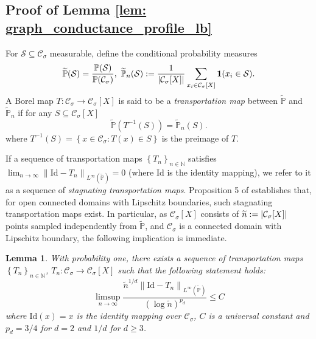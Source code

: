 \documentclass{article}
\DeclarePairedDelimiter\abs{\lvert}{\rvert}
\newcommand{\set}[1]{\left\{#1\right\}}
\newcommand{\seq}[1]{\left\{#1\right\}_{n \in \mathbb{N}}}
\newcommand{\norm}[1]{\left\lVert#1\right\rVert}
\newcommand{\1}{\mathbf{1}}
\newcommand{\Xbf}{X}             %
\newcommand{\Pbb}{\mathbb{P}}
\newcommand{\Sset}{\mathcal{S}}
\newcommand{\Cset}{\mathcal{C}}
\newcommand{\Csig}{\Cset_{\sigma}}
\theoremstyle{aldenthm}
\newtheorem{lemma}{Lemma}
\theoremstyle{aldenrmrk}
\begin{document}
\subsection{Proof of Lemma \ref{lem: graph_conductance_profile_lb}}
\label{sec: proof_of_lemma_graph_conductance}

For $\Sset \subseteq \Csig$ measurable, define the conditional probability measures
\begin{equation*}
\widetilde{\Pbb}(\Sset) = \frac{\Pbb(\Sset)}{\Pbb(\Csig)}, ~ \widetilde{\Pbb}_{n}(\Sset) := \frac{1}{\abs{\Csig[\Xbf]}} \sum_{x_i \in \Csig[\Xbf]} \1(x_i \in \Sset).
\end{equation*} 
A Borel map $T: \Csig \to \Csig[\Xbf]$ is said to be a \emph{transportation map} between $\widetilde{\Pbb}$ and $\widetilde{\Pbb}_n$ if for any $S \subseteq \Csig[\Xbf]$
\begin{equation*}
\widetilde{\Pbb}(T^{-1}(S)) = \widetilde{\Pbb}_n(S).
\end{equation*}
where $T^{-1}(S) = \set{x \in \Csig: T(x) \in S}$ is the preimage of $T$. 

If a sequence of transportation maps $\seq{T_n}$ satisfies $\lim_{n \to \infty}\norm{\mathrm{Id} - T_n}_{L^{\infty}(\widetilde{\Pbb})} = 0$ (where $\mathrm{Id}$ is the identity mapping), we refer to it as a sequence of \emph{stagnating transportation maps}. Proposition 5 of \cite{garciatrillos16} establishes that, for open connected domains with Lipschitz boundaries, such stagnating transportation maps exist. In particular, as $\Csig[\Xbf]$ consists of $\widetilde{n} := \abs{\Csig[\Xbf]}$ points sampled independently from $\widetilde{\Pbb}$, and $\Csig$ is a connected domain with Lipschitz boundary, the following implication is immediate.

\begin{lemma}
	\label{lem: stagnating_transportation_maps}
	With probability one, there exists a sequence of transportation maps $\seq{T_n}$, $T_n: \Csig \to \Csig[\Xbf]$ such that the following statement holds:
	\begin{equation}
	\label{eqn: stagnating_transportation_maps}
	\limsup_{n \to \infty} \frac{\widetilde{n}^{1/d} \norm{\mathrm{Id} - T_n}_{L^{\infty}(\widetilde{\Pbb})}}{(\log \widetilde{n})^{p_d}} \leq C
	\end{equation}
	where $\mathrm{Id}(x) = x$ is the identity mapping over $\Csig$, $C$ is a universal constant and $p_d = 3/4$ for $d = 2$ and $1/d$ for $d \geq 3$.
\end{lemma}
\end{document}
